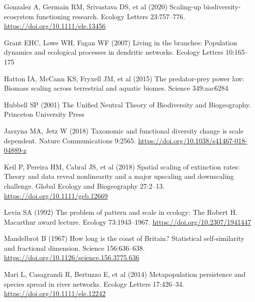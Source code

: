 \documentclass[
  12pt,
]{article}
\newlength{\cslhangindent}
\newlength{\cslentryspacingunit} %
\newenvironment{CSLReferences}[2] %
 {%
  \setlength{\parindent}{0pt}
  \ifodd #1
  \let\oldpar\par
  \def\par{\hangindent=\cslhangindent\oldpar}
  \fi
  \setlength{\parskip}{#2\cslentryspacingunit}
 }%
 {}
\begin{document}
\begin{CSLReferences}{1}{0}
\leavevmode{}%
Gonzalez A, Germain RM, Srivastava DS, et al (2020) Scaling-up biodiversity-ecosystem functioning research. Ecology Letters 23:757--776. \url{https://doi.org/10.1111/ele.13456}

\leavevmode{}%
Grant EHC, Lowe WH, Fagan WF (2007) Living in the branches: Population dynamics and ecological processes in dendritic networks. Ecology Letters 10:165--175

\leavevmode{}%
Hatton IA, McCann KS, Fryxell JM, et al (2015) The predator-prey power law: {Biomass} scaling across terrestrial and aquatic biomes. Science 349:aac6284

\leavevmode{}%
Hubbell SP (2001) The {Unified Neutral Theory} of {Biodiversity} and {Biogeography}. {Princeton University Press}

\leavevmode{}%
Jarzyna MA, Jetz W (2018) Taxonomic and functional diversity change is scale dependent. Nature Communications 9:2565. \url{https://doi.org/10.1038/s41467-018-04889-z}

\leavevmode{}%
Keil P, Pereira HM, Cabral JS, et al (2018) Spatial scaling of extinction rates: {Theory} and data reveal nonlinearity and a major upscaling and downscaling challenge. Global Ecology and Biogeography 27:2--13. \url{https://doi.org/10.1111/geb.12669}

\leavevmode{}%
Levin SA (1992) The problem of pattern and scale in ecology: The {Robert H}. {Macarthur} award lecture. Ecology 73:1943--1967. \url{https://doi.org/10.2307/1941447}

\leavevmode{}%
Mandelbrot B (1967) How long is the coast of {Britain}? {Statistical} self-similarity and fractional dimension. Science 156:636--638. \url{https://doi.org/10.1126/science.156.3775.636}

\leavevmode{}%
Mari L, Casagrandi R, Bertuzzo E, et al (2014) Metapopulation persistence and species spread in river networks. Ecology Letters 17:426--34. \url{https://doi.org/10.1111/ele.12242}


\end{CSLReferences}
\end{document}
